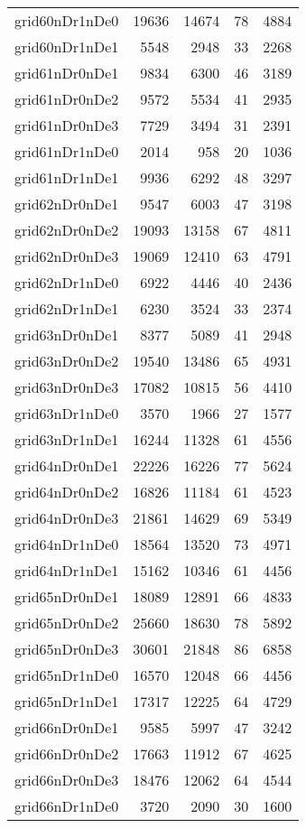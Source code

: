 \begin{longtable}{lrrrr}
grid60nDr1nDe0 & 19636 & 14674 & 78 & 4884 \\
grid60nDr1nDe1 & 5548 & 2948 & 33 & 2268 \\
grid61nDr0nDe1 & 9834 & 6300 & 46 & 3189 \\
grid61nDr0nDe2 & 9572 & 5534 & 41 & 2935 \\
grid61nDr0nDe3 & 7729 & 3494 & 31 & 2391 \\
grid61nDr1nDe0 & 2014 & 958 & 20 & 1036 \\
grid61nDr1nDe1 & 9936 & 6292 & 48 & 3297 \\
grid62nDr0nDe1 & 9547 & 6003 & 47 & 3198 \\
grid62nDr0nDe2 & 19093 & 13158 & 67 & 4811 \\
grid62nDr0nDe3 & 19069 & 12410 & 63 & 4791 \\
grid62nDr1nDe0 & 6922 & 4446 & 40 & 2436 \\
grid62nDr1nDe1 & 6230 & 3524 & 33 & 2374 \\
grid63nDr0nDe1 & 8377 & 5089 & 41 & 2948 \\
grid63nDr0nDe2 & 19540 & 13486 & 65 & 4931 \\
grid63nDr0nDe3 & 17082 & 10815 & 56 & 4410 \\
grid63nDr1nDe0 & 3570 & 1966 & 27 & 1577 \\
grid63nDr1nDe1 & 16244 & 11328 & 61 & 4556 \\
grid64nDr0nDe1 & 22226 & 16226 & 77 & 5624 \\
grid64nDr0nDe2 & 16826 & 11184 & 61 & 4523 \\
grid64nDr0nDe3 & 21861 & 14629 & 69 & 5349 \\
grid64nDr1nDe0 & 18564 & 13520 & 73 & 4971 \\
grid64nDr1nDe1 & 15162 & 10346 & 61 & 4456 \\
grid65nDr0nDe1 & 18089 & 12891 & 66 & 4833 \\
grid65nDr0nDe2 & 25660 & 18630 & 78 & 5892 \\
grid65nDr0nDe3 & 30601 & 21848 & 86 & 6858 \\
grid65nDr1nDe0 & 16570 & 12048 & 66 & 4456 \\
grid65nDr1nDe1 & 17317 & 12225 & 64 & 4729 \\
grid66nDr0nDe1 & 9585 & 5997 & 47 & 3242 \\
grid66nDr0nDe2 & 17663 & 11912 & 67 & 4625 \\
grid66nDr0nDe3 & 18476 & 12062 & 64 & 4544 \\
grid66nDr1nDe0 & 3720 & 2090 & 30 & 1600 \\

\end{longtable}
